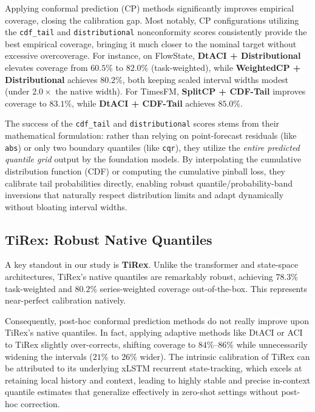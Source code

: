 \documentclass[12pt, a4paper]{article}
\begin{document}
Applying conformal prediction (CP) methods significantly improves empirical coverage, closing the calibration gap. Most notably, CP configurations utilizing the \texttt{cdf\_tail} and \texttt{distributional} nonconformity scores consistently provide the best empirical coverage, bringing it much closer to the nominal target without excessive overcoverage. For instance, on FlowState, \textbf{DtACI + Distributional} elevates coverage from \(60.5\%\) to \(82.0\%\) (task-weighted), while \textbf{WeightedCP + Distributional} achieves \(80.2\%\), both keeping scaled interval widths modest (under \(2.0\times\) the native width). For TimesFM, \textbf{SplitCP + CDF-Tail} improves coverage to \(83.1\%\), while \textbf{DtACI + CDF-Tail} achieves \(85.0\%\).

The success of the \texttt{cdf\_tail} and \texttt{distributional} scores stems from their mathematical formulation: rather than relying on point-forecast residuals (like \texttt{abs}) or only two boundary quantiles (like \texttt{cqr}), they utilize the \textit{entire predicted quantile grid} output by the foundation models. By interpolating the cumulative distribution function (CDF) or computing the cumulative pinball loss, they calibrate tail probabilities directly, enabling robust quantile/probability-band inversions that naturally respect distribution limits and adapt dynamically without bloating interval widths.

\subsection{TiRex: Robust Native Quantiles}
A key standout in our study is \textbf{TiRex}. Unlike the transformer and state-space architectures, TiRex's native quantiles are remarkably robust, achieving \(78.3\%\) task-weighted and \(80.2\%\) series-weighted coverage out-of-the-box. This represents near-perfect calibration natively.

Consequently, post-hoc conformal prediction methods do not really improve upon TiRex's native quantiles. In fact, applying adaptive methods like DtACI or ACI to TiRex slightly over-corrects, shifting coverage to \(84\%\)--\(86\%\) while unnecessarily widening the intervals (\(21\%\) to \(26\%\) wider). The intrinsic calibration of TiRex can be attributed to its underlying xLSTM recurrent state-tracking, which excels at retaining local history and context, leading to highly stable and precise in-context quantile estimates that generalize effectively in zero-shot settings without post-hoc correction.
\end{document}
